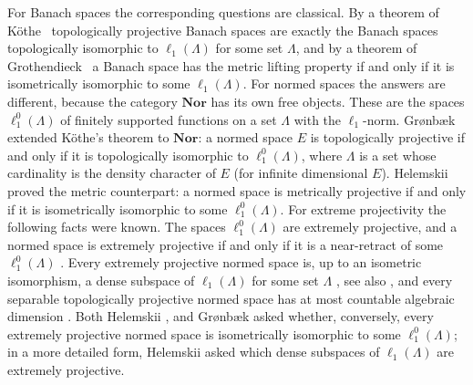 \documentclass[12pt]{article}
\newcommand{\Nor}{\mathbf{Nor}}
\newcommand{\lo}[1]{\ell_1^0(#1)}
\newcommand{\ellone}[1]{\ell_1(#1)}
\begin{document}
For Banach spaces the corresponding questions are classical. By a theorem of
K\"othe~\cite{KotheTopProjBanSp} topologically projective Banach spaces are
exactly the Banach spaces topologically isomorphic to $\ellone{\Lambda}$ for some
set $\Lambda$, and by a theorem of Grothendieck~\cite{GrothMetrProjFlatBanSp}
a Banach space has the metric lifting property if and only if it is
isometrically isomorphic to some $\ellone{\Lambda}$. For normed spaces the
answers are different, because the category $\Nor$ has its own free objects.
These are the spaces $\lo{\Lambda}$ of finitely supported functions on a set
$\Lambda$ with the $\ell_1$-norm. Gr{\o}nb{\ae}k~\cite{GronLiftProbNormSp}
extended K\"othe's theorem to $\Nor$: a normed space $E$ is topologically
projective if and only if it is topologically isomorphic to $\lo{\Lambda}$,
where $\Lambda$ is a set whose cardinality is the density character of $E$
(for infinite dimensional $E$).
Helemskii~\cite{HelMetrFrQMod} proved the metric counterpart: a normed space
is metrically projective if and only if it is isometrically isomorphic to some
$\lo{\Lambda}$. For extreme projectivity the following facts were known. The
spaces $\lo{\Lambda}$ are extremely projective, and a normed space is
extremely projective if and only if it is a near-retract of some
$\lo{\Lambda}$ \cite[proposition 2.2 and the proposition of the
introduction]{HelExtrProjSeqAlg}. Every
extremely projective normed space is, up to an isometric isomorphism, a
dense subspace of $\ellone{\Lambda}$ for some set $\Lambda$
\cite[proposition 2.3]{HelExtrProjSeqAlg}, see also
\cite[section 3]{GronLiftProbNormSp}, and every separable topologically
projective normed space has at most countable algebraic dimension
\cite[proposition 2.4]{HelExtrProjSeqAlg}. Both Helemskii
\cite[section 2]{HelExtrProjSeqAlg}, \cite[remark 3.6]{HelMetrFrQMod} and
Gr{\o}nb{\ae}k
\cite[conjecture 3.1]{GronLiftProbNormSp} asked whether, conversely, every
extremely projective normed space is isometrically isomorphic to some
$\lo{\Lambda}$; in a more detailed form, Helemskii asked which dense subspaces
of $\ellone{\Lambda}$ are extremely projective.
\end{document}
